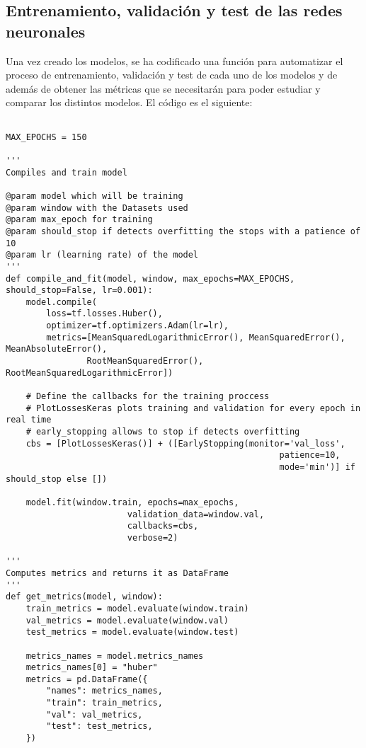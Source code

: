 \subsection{Entrenamiento, validación y test de las redes neuronales}


Una vez creado los modelos, se ha codificado una función para automatizar el proceso de entrenamiento, validación y test de cada uno de los modelos y de además de obtener las métricas que se necesitarán para poder estudiar y comparar los distintos modelos. El código es el siguiente:

\begin{verbatim}

MAX_EPOCHS = 150

'''
Compiles and train model

@param model which will be training
@param window with the Datasets used
@param max_epoch for training
@param should_stop if detects overfitting the stops with a patience of 10
@param lr (learning rate) of the model
'''
def compile_and_fit(model, window, max_epochs=MAX_EPOCHS, should_stop=False, lr=0.001):
    model.compile(
        loss=tf.losses.Huber(),
        optimizer=tf.optimizers.Adam(lr=lr),
        metrics=[MeanSquaredLogarithmicError(), MeanSquaredError(), MeanAbsoluteError(),
                RootMeanSquaredError(), RootMeanSquaredLogarithmicError])
    
    # Define the callbacks for the training proccess
    # PlotLossesKeras plots training and validation for every epoch in real time
    # early_stopping allows to stop if detects overfitting
    cbs = [PlotLossesKeras()] + ([EarlyStopping(monitor='val_loss',
                                                      patience=10,
                                                      mode='min')] if should_stop else [])
    
    model.fit(window.train, epochs=max_epochs,
                        validation_data=window.val,
                        callbacks=cbs,
                        verbose=2)
    
'''
Computes metrics and returns it as DataFrame
'''
def get_metrics(model, window):
    train_metrics = model.evaluate(window.train)
    val_metrics = model.evaluate(window.val)
    test_metrics = model.evaluate(window.test)

    metrics_names = model.metrics_names
    metrics_names[0] = "huber"
    metrics = pd.DataFrame({
        "names": metrics_names,
        "train": train_metrics,
        "val": val_metrics,
        "test": test_metrics,
    })


\end{verbatim}
